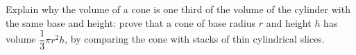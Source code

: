 Explain why the volume of a cone is one third of the volume of the cylinder with the same base and height: prove that a cone of base radius $r$ and height $h$ has volume $\dfrac{1}{3}\pi r^2h$, by comparing the cone with stacks of thin cylindrical slices.
